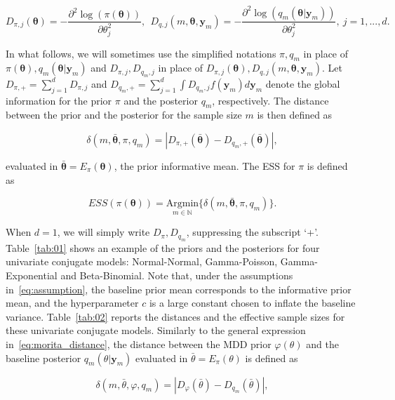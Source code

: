 \documentclass{statsoc}
\begin{document}
\begin{equation}
D_{\pi,j}(\bm{\theta})= -\frac{\partial^{2} \log(\pi(\bm{\theta}))}{\partial \theta^{2}_{j}}, \ \ D_{q,j}(m, \bm{\theta}, \bm{y}_{m})=-\frac{\partial^{2} \log(q_{m}(\bm{\theta}|\bm{y}_{m}))}{\partial\theta^{2}_{j}}, \ j=1,...,d.
\label{eq:morita:derivative}
\end{equation}

In what follows, we will sometimes use the simplified notations $\pi, q_{m}$ in place of $\pi(\bm{\theta}), q_{m}(\bm{\theta}|\bm{y}_{m})$ and $D_{\pi,j},  D_{q_{m},j}$ in place of $D_{\pi,j}(\bm{\theta}), D_{q,j}(m, \bm{\theta}, \bm{y}_{m})$. 
Let $D_{\pi,+}=\sum_{j=1}^{d} D_{\pi,j}$ and $D_{q_{m},+}=\sum_{j=1}^{d} \int D_{q_{m},j}f(\bm{y}_{m})d\bm{y}_{m}$ denote the global information for the prior $\pi$ and the posterior $q_{m}$, respectively. The distance between the prior and the posterior for the sample size $m$ is then defined as

\begin{equation}
\delta(m, \bar{\bm{\theta}}, \pi, q_{m})=| D_{\pi,+}(\bar{\bm{\theta}})-D_{q_{m},+}(\bar{\bm{\theta}})|,
\label{eq:morita_distance}
\end{equation}

evaluated in $\bar{\bm{\theta}}=E_{\pi}(\bm{\theta})$, the prior informative mean. The ESS for $\pi$ is defined as

\begin{equation}
ESS(\pi(\bm{\theta}))=\underset{m \in \mathbb{N}}{\mbox{Argmin}} \{ \delta(m, \bar{\bm{\theta}}, \pi, q_{m})  \}.
\label{eq:morita:ess}
\end{equation}

When $d=1$, we will simply write $D_{\pi}, D_{q_{m}}$, suppressing the subscript `+'. Table~\ref{tab:01} shows an example of the priors and the posteriors for four univariate conjugate models: Normal-Normal, Gamma-Poisson, Gamma-Exponential and Beta-Binomial. Note that, under the assumptions in~\eqref{eq:assumption}, the baseline prior mean corresponds to the informative prior mean, and the hyperparameter $c$ is a large constant chosen to inflate the baseline variance.
 Table~\ref{tab:02} reports the  distances and the effective sample sizes for these univariate conjugate models. Similarly to the general expression in~\eqref{eq:morita_distance}, the distance between the MDD prior $\varphi(\theta)$ and the baseline posterior $q_{m}(\theta|\bm{y}_{m})$ evaluated in $\bar{\theta}=E_{\pi}(\theta)$ is defined as

\begin{equation}
\delta(m, \bar{\theta}, \varphi, q_{m})=| D_{\varphi}(\bar{\theta})-D_{q_{m}}(\bar{\theta})|,
\label{eq:egidi_distance}
\end{equation}
\end{document}
